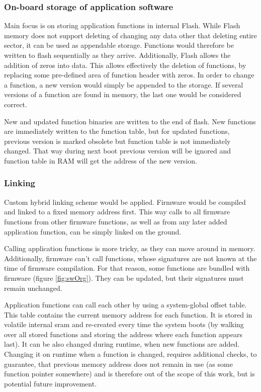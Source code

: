 \subsubsection{On-board storage of application software}

Main focus is on storing application functions in internal Flash. While Flash memory does not support deleting of changing any data other that deleting entire sector, it can be used as appendable storage. Functions would therefore be written to flash sequentially as they arrive. Additionally, Flash allows the addition of zeros into data. This allows effectively the deletion of functions, by replacing some pre-defined area of function header with zeros. In order to change a function, a new version would simply be appended to the storage. If several versions of a function are found in memory, the last one would be considered correct.

New and updated function binaries are written to the end of flash. New functions are immediately written to the function table, but for updated functions, previous version is marked obsolete but function table is not immediately changed. That way during next boot previous version will be ignored and function table in RAM will get the address of the new version.

\subsubsection{Linking}

Custom hybrid linking scheme would be applied. Firmware would be compiled and linked to a fixed memory address first. This way calls to all firmware functions from other firmware functions, as well as from any later added application function, can be simply linked on the ground.

Calling application functions is more tricky, as they can move around in memory. Additionally, firmware can't call functions, whose signatures are not known at the time of firmware compilation. For that reason, some functions are bundled with firmware (figure \ref{fig:swOrg}). They can be updated, but their signatures must remain unchanged.

Application functions can call each other by using a system-global offset table. This table contains the current memory address for each function. It is stored in volatile internal \gls{sram} and re-created every time the system boots (by walking over all stored functions and storing the address where each function appears last). It can be also changed during runtime, when new functions are added. Changing it on runtime when a function is changed, requires additional checks, to guarantee, that previous memory address does not remain in use (as some function pointer somewhere) and is therefore out of the scope of this work, but is potential future improvement.

